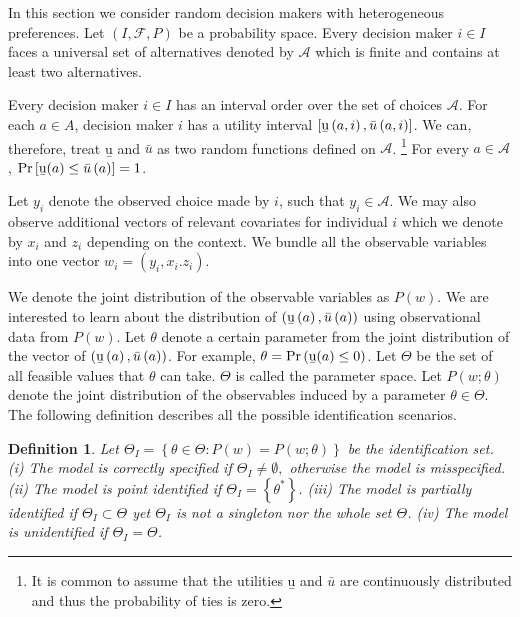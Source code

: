 \documentclass{article}
\newtheorem{definition}{Definition}
\begin{document}
In this section we consider random decision makers with heterogeneous preferences. Let $\left(I,\mathcal{F},P \right)$ be a probability space. Every decision maker $i\in I$ faces a universal set of alternatives denoted by $\mathcal{A}$ which is finite and contains at least two alternatives.

Every decision maker $i\in I$ has an interval order over the set of choices $\mathcal{A}$. For each $a\in A$, decision maker $i$ has a utility interval $\left[ \text{\b{u}}\left( a,i\right) ,\bar{u}\left( a,i\right) \right] $. We can, therefore, treat \b{u} and $\bar{u}$ as two random functions defined on 
$\mathcal{A}$. \footnote{It is common to assume that the utilities \b{u} and $\bar{u}$ are continuously distributed and thus the probability of ties is zero.} For every $a\in \mathcal{A}$, $\Pr \left[ \text{\b{u}}(a)\leq \bar{u}\left( a\right) \right] =1$.

Let $y_{i}$ denote the observed choice made by $i$, such that $y_{i}\in \mathcal{A}$. We may also observe additional vectors of relevant covariates for individual $i$ which we denote by $x_{i}$ and $z_{i}$ depending on the context. We bundle all the observable variables into one vector $w_{i}=\left( y_{i},x_{i}.z_{i}\right) $.

We denote the joint distribution of the observable variables as $P\left(w\right)$. We are interested to learn about the distribution of $\left(\text{\b{u}}\left( a\right) ,\bar{u}\left( a\right) \right)$ using
observational data from $P\left( w\right) $. Let $\theta $ denote a certain parameter from the joint distribution of the vector of $\left( \text{\b{u}} \left( a\right) ,\bar{u}\left( a\right) \right)$. For example, $\theta =\Pr \left( \text{\b{u}}(a)\leq 0\right) $. Let $\Theta$ be the set of all feasible values that $\theta $ can take. $\Theta $ is called the parameter space. Let $P\left( w;\theta \right) $ denote the joint distribution of the observables induced by a parameter $\theta \in \Theta $. The following
definition describes all the possible identification scenarios.

\begin{definition}
Let $\Theta _{I}=\left\{ \theta \in \Theta :P\left( w\right) =P\left( w;\theta \right) \right\} $ be the identification set.\newline
(i) The model is \emph{correctly specified} if $\Theta _{I}\neq \emptyset ,$%
otherwise the model is \emph{misspecified}.\newline
(ii) The model is \emph{point identified} if $\Theta _{I}=\left\{ \theta
^{\ast }\right\} $. \newline
(iii) The model is \emph{partially identified} if $\Theta _{I}\subset \Theta 
$ yet $\Theta _{I}$ is not a singleton nor the whole set $\Theta $.\newline
(iv) The model is \emph{unidentified} if $\Theta _{I}=\Theta $.
\end{definition}
\end{document}
